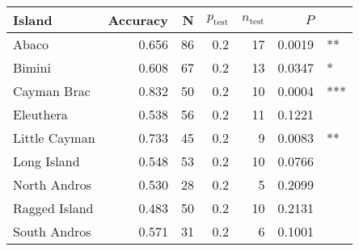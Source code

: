 
\begin{tabular}{lrrrrrl}
\toprule
Island & Accuracy & N & $p_{\mbox{test}}$ & $n_{\mbox{test}}$ & $P$ & \\
\midrule
Abaco & 0.656 & 86 & 0.2 & 17 & 0.0019 & **\\
Bimini & 0.608 & 67 & 0.2 & 13 & 0.0347 & *\\
Cayman Brac & 0.832 & 50 & 0.2 & 10 & 0.0004 & ***\\
Eleuthera & 0.538 & 56 & 0.2 & 11 & 0.1221 & \\
Little Cayman & 0.733 & 45 & 0.2 & 9 & 0.0083 & **\\
Long Island & 0.548 & 53 & 0.2 & 10 & 0.0766 & \\
North Andros & 0.530 & 28 & 0.2 & 5 & 0.2099 & \\
Ragged Island & 0.483 & 50 & 0.2 & 10 & 0.2131 & \\
South Andros & 0.571 & 31 & 0.2 & 6 & 0.1001 & \\
\bottomrule
\end{tabular}
